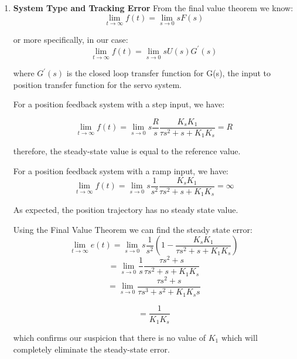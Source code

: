 \documentclass[11pt,a4paper]{article}
\begin{document}
\begin{enumerate}
\item \textbf{System Type and Tracking Error}
From the final value theorem we know:
\begin{equation}
	\lim_{t \to \infty} f(t) = \lim_{s \to 0}sF(s)
\end{equation}

or more specifically, in our case:
\begin{equation}
	\lim_{t \to \infty} f(t) = \lim_{s \to 0}sU(s)G^{\prime}(s)
\end{equation}

where $G^{\prime}(s)$ is the closed loop transfer function for G(s), the input to position transfer function for the servo system.

For a position feedback system with a step input, we have:

\begin{equation}
	\lim_{t \to \infty} f(t) = \lim_{s \to 0}s\frac{R}{s}\frac{K_{s}K_{1}}{\tau s^{2} + s + K_{1}K_{s}} = R
\end{equation}

therefore, the steady-state value is equal to the reference value.

For a position feedback system with a ramp input, we have:
\begin{equation}
	\lim_{t \to \infty} f(t) = \lim_{s \to 0}s\frac{1}{s^{2}}\frac{K_{s}K_{1}}{\tau s^{2} + s + K_{1}K_{s}} = \infty
\end{equation}

As expected, the position trajectory has no steady state value.

Using the Final Value Theorem we can find the steady state error:
\begin{equation}
	\lim_{t \to \infty} e(t) 
	= \lim_{s \to 0}s\frac{1}{s^{2}}(1 - \frac{K_{s}K_{1}}{\tau s^{2} + s + K_{1}K_{s}})
\end{equation}
\begin{equation}	
	 = \lim_{s \to 0}\frac{1}{s}\frac{\tau s^{2} + s}{\tau s^{2} + s + K_{1}K_{s}} 
\end{equation}
\begin{equation}	
	= \lim_{s \to 0}\frac{\tau s^{2} + s}{\tau s^{3} + s^{2} + K_{1}K_{s}s} 
\end{equation}

\begin{equation}
	= \frac{1}{K_{1}K_{s}}
\end{equation}

which confirms our suspicion that there is no value of $K_{1}$ which will completely eliminate the steady-state error.


\end{enumerate}
\end{document}
